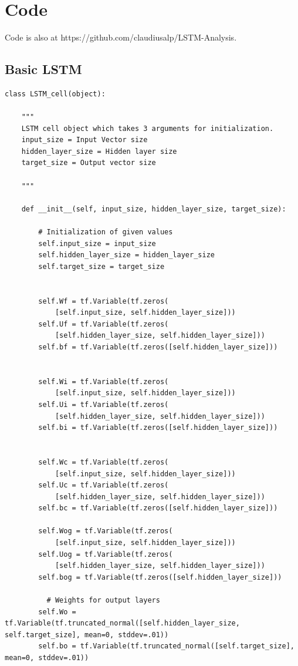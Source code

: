 \documentclass[12pt, letterpaper]{article}
\begin{document}
\section{Code}
Code is also at https://github.com/claudiusalp/LSTM-Analysis.
\subsection{Basic LSTM}
\begin{verbatim}
class LSTM_cell(object):

    """
    LSTM cell object which takes 3 arguments for initialization.
    input_size = Input Vector size
    hidden_layer_size = Hidden layer size
    target_size = Output vector size

    """

    def __init__(self, input_size, hidden_layer_size, target_size):

        # Initialization of given values
        self.input_size = input_size
        self.hidden_layer_size = hidden_layer_size
        self.target_size = target_size


        self.Wf = tf.Variable(tf.zeros(
            [self.input_size, self.hidden_layer_size]))
        self.Uf = tf.Variable(tf.zeros(
            [self.hidden_layer_size, self.hidden_layer_size]))
        self.bf = tf.Variable(tf.zeros([self.hidden_layer_size]))        

        
        self.Wi = tf.Variable(tf.zeros(
            [self.input_size, self.hidden_layer_size]))
        self.Ui = tf.Variable(tf.zeros(
            [self.hidden_layer_size, self.hidden_layer_size]))
        self.bi = tf.Variable(tf.zeros([self.hidden_layer_size]))        

        
        self.Wc = tf.Variable(tf.zeros(
            [self.input_size, self.hidden_layer_size]))
        self.Uc = tf.Variable(tf.zeros(
            [self.hidden_layer_size, self.hidden_layer_size]))
        self.bc = tf.Variable(tf.zeros([self.hidden_layer_size]))
        
        self.Wog = tf.Variable(tf.zeros(
            [self.input_size, self.hidden_layer_size]))
        self.Uog = tf.Variable(tf.zeros(
            [self.hidden_layer_size, self.hidden_layer_size]))
        self.bog = tf.Variable(tf.zeros([self.hidden_layer_size]))
        
          # Weights for output layers
        self.Wo = tf.Variable(tf.truncated_normal([self.hidden_layer_size, self.target_size], mean=0, stddev=.01))
        self.bo = tf.Variable(tf.truncated_normal([self.target_size], mean=0, stddev=.01))
        

\end{verbatim}
\end{document}
